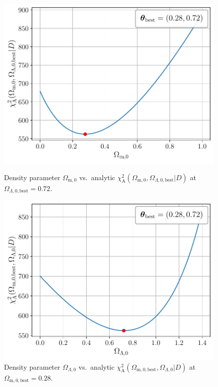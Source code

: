 \begin{figure}
    \begin{minipage}{8cm}
        \centering
        \includegraphics[scale=0.52]{figures/plots/PDF/Lambda-CDM-analytic-chi2_Omega-m0-vs-chi2-at-Omega-Lambda0-best.pdf}
        \caption{Density parameter $\Omega_{\text{m},0}$ vs.\ analytic $\chi_{\text{A}}^2(\Omega_{\text{m},0}, \Omega_{\Lambda, 0, \text{best}} \vert D)$ at $\Omega_{\Lambda, 0, \text{best}} = 0.72$.}
        \label{fig:Lambda-CDM-analytic-chi2_Omega-m0-vs-chi2-at-Omega-Lambda0-best}
    \end{minipage}
    \hspace*{1cm}
    \begin{minipage}{8cm}
        \includegraphics[scale=0.52]{figures/plots/PDF/Lambda-CDM-analytic-chi2_Omega-Lambda0-vs-chi2-at-Omega-m0-best.pdf}
        \caption{Density parameter $\Omega_{\Lambda,0}$ vs.\ analytic $\chi_{\text{A}}^2(\Omega_{\text{m}, 0, \text{best}}, \Omega_{\Lambda, 0} \vert D)$ at $\Omega_{\text{m}, 0, \text{best}} = 0.28$.}
        \label{fig:Lambda-CDM-analytic-chi2_Omega-Lambda0-vs-chi2-at-Omega-m0-best}
    \end{minipage}
\end{figure}

